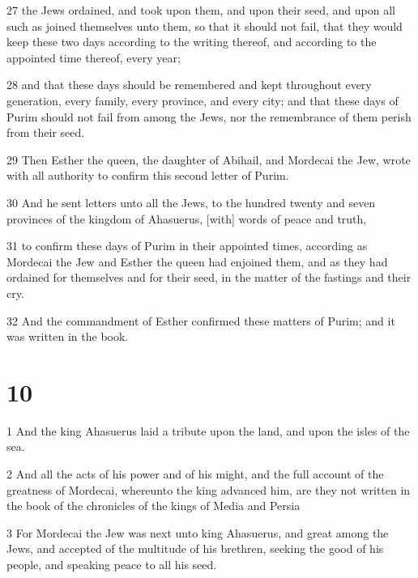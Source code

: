 \par 27 the Jews ordained, and took upon them, and upon their seed, and upon all such as joined themselves unto them, so that it should not fail, that they would keep these two days according to the writing thereof, and according to the appointed time thereof, every year;
\par 28 and that these days should be remembered and kept throughout every generation, every family, every province, and every city; and that these days of Purim should not fail from among the Jews, nor the remembrance of them perish from their seed.
\par 29 Then Esther the queen, the daughter of Abihail, and Mordecai the Jew, wrote with all authority to confirm this second letter of Purim.
\par 30 And he sent letters unto all the Jews, to the hundred twenty and seven provinces of the kingdom of Ahasuerus, [with] words of peace and truth,
\par 31 to confirm these days of Purim in their appointed times, according as Mordecai the Jew and Esther the queen had enjoined them, and as they had ordained for themselves and for their seed, in the matter of the fastings and their cry.
\par 32 And the commandment of Esther confirmed these matters of Purim; and it was written in the book.

\chapter{10}

\par 1 And the king Ahasuerus laid a tribute upon the land, and upon the isles of the sea.
\par 2 And all the acts of his power and of his might, and the full account of the greatness of Mordecai, whereunto the king advanced him, are they not written in the book of the chronicles of the kings of Media and Persia
\par 3 For Mordecai the Jew was next unto king Ahasuerus, and great among the Jews, and accepted of the multitude of his brethren, seeking the good of his people, and speaking peace to all his seed.

